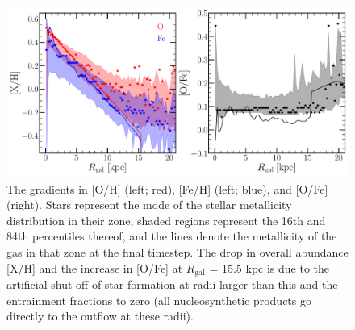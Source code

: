 \documentclass[12pt]{report}
\begin{document}
\begin{figure}[!h] 
\centering 
\includegraphics[scale = 0.4]{../plots/gradients/metallicity/moddisk_vigorousSF.pdf} 
\caption{
The gradients in [O/H] (left; red), [Fe/H] (left; blue), and [O/Fe] (right). 
Stars represent the mode of the stellar metallicity distribution in their zone, 
shaded regions represent the 16th and 84th percentiles thereof, and the lines 
denote the metallicity of the gas in that zone at the final timestep. The 
drop in overall abundance [X/H] and the increase in [O/Fe] at $R_\text{gal}$ = 
15.5 kpc is due to the artificial shut-off of star formation at radii larger 
than this and the entrainment fractions to zero (all nucleosynthetic products 
go directly to the outflow at these radii). 
}
\end{figure}
\end{document}
